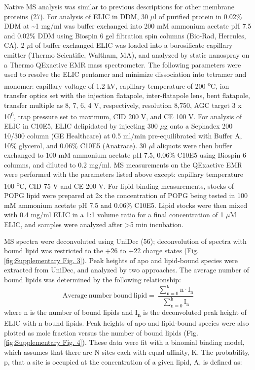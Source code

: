 Native MS analysis was similar to previous descriptions for other
membrane proteins (27). For analysis of ELIC in DDM, 30 $\mu$l of purified
protein in 0.02\% DDM at \textasciitilde{}1 mg/ml was buffer exchanged
into 200 mM ammonium acetate pH 7.5 and 0.02\% DDM using Biospin 6 gel
filtration spin columns (Bio-Rad, Hercules, CA). 2 $\mu$l of buffer
exchanged ELIC was loaded into a borosilicate capillary emitter (Thermo
Scientific, Waltham, MA), and analyzed by static nanospray on a Thermo
QExactive EMR mass spectrometer. The following parameters were used to
resolve the ELIC pentamer and minimize dissociation into tetramer and
monomer: capillary voltage of 1.2 kV, capillary temperature of 200
\textsuperscript{o}C, ion transfer optics set with the injection
flatapole, inter-flatapole lens, bent flatapole, transfer multiple as 8,
7, 6, 4 V, respectively, resolution 8,750, AGC target 3 x
10\textsuperscript{6}, trap pressure set to maximum, CID 200 V, and CE
100 V. For analysis of ELIC in C10E5, ELIC delipidated by injecting 300
$\mu$g onto a Sephadex 200 10/300 column (GE Healthcare) at 0.5 ml/min
pre-equilibrated with Buffer A, 10\% glycerol, and 0.06\% C10E5
(Anatrace). 30 $\mu$l aliquots were then buffer exchanged to 100 mM ammonium
acetate pH 7.5, 0.06\% C10E5 using Biospin 6 columns, and diluted to 0.2
mg/ml. MS measurements on the QExactive EMR were performed with the
parameters listed above except: capillary temperature 100
\textsuperscript{o}C, CID 75 V and CE 200 V. For lipid binding
measurements, stocks of POPG lipid were prepared at 2x the concentration
of POPG being tested in 100 mM ammonium acetate pH 7.5 and 0.06\% C10E5.
Lipid stocks were then mixed with 0.4 mg/ml ELIC in a 1:1 volume ratio
for a final concentration of 1 $\mu$M ELIC, and samples were analyzed after
\textgreater{}5 min incubation.

MS spectra were deconvoluted using UniDec (56); deconvolution of spectra
with bound lipid was restricted to the +26 to +22 charge states
(Fig. \ref{fig:Supplementary Fig. 3}). Peak heights of apo and lipid-bound species were
extracted from UniDec, and analyzed by two approaches. The average
number of bound lipids was determined by the following relationship:
\begin{equation}
\mathrm{Average\ number\ bound\ lipid = \ }\frac{\sum_{\mathrm{n = 0}}^{\mathrm{k}}{\mathrm{n \cdot}\mathrm{I}_{\mathrm{n}}}}{\sum_{\mathrm{n = 0}}^{\mathrm{k}}\mathrm{I}_{\mathrm{n}}}
\end{equation}
where n is the number of bound lipids and I\textsubscript{n} is the
deconvoluted peak height of ELIC with n bound lipids. Peak heights of
apo and lipid-bound species were also plotted as mole fraction versus
the number of bound lipids (Fig. \ref{fig:Supplementary Fig. 4}). These data were fit
with a binomial binding model, which assumes that there are N sites each
with equal affinity, K. The probability, p, that a site is occupied at
the concentration of a given lipid, A, is defined as:


